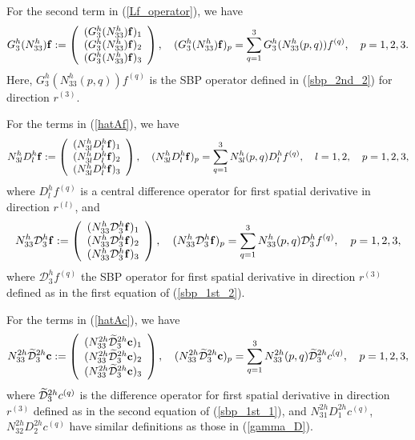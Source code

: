 For the second term in (\ref{Lf_operator}), we have
\begin{align}\label{3_10_2}
{{G}}_3^{h}({N}_{33}^{h}){\bf f} := \left(\begin{array}{c}
({{G}}_3^{h}({N}_{33}^{h}){\bf f})_1 \\
({{G}}_3^{h}({N}_{33}^{h}){\bf f})_2 \\
({{G}}_3^{h}({N}_{33}^{h}){\bf f})_3 
\end{array}\right), \quad ({{G}}_3^{h}({N}_{33}^{h}){\bf f})_p = \sum_{q = 1}^{3} {G}_3^{h}(N_{33}^{h}(p,q)) {f}^{(q)},\quad p = 1,2,3.
\end{align}
Here, ${G}_3^{h}(N_{33}^{h}(p,q)) {f}^{(q)}$ is the SBP operator defined in (\ref{sbp_2nd_2}) for direction $r^{(3)}$. 

For the terms in (\ref{hatAf}), we have
\begin{align}\label{gamma_D} 
{N}_{3l}^hD_l^h{\bf f} := \left(\begin{array}{c}
({N}_{3l}^hD_l^h{\bf f})_1 \\
({N}_{3l}^hD_l^h{\bf f})_2 \\
({N}_{3l}^hD_l^h{\bf f})_3 
\end{array}\right), \quad ({N}_{3l}^hD_l^h{\bf f})_p = \sum_{q = 1}^{3} N_{3l}^h(p,q)D_l^h{f}^{(q)},\quad l = 1,2, \quad p = 1,2,3,
\end{align}
where $D_l^h{f}^{(q)}$ is a central difference operator for first spatial derivative in direction $r^{(l)}$, and
\begin{align}\label{gamma_D1}
{N}_{33}^h\mathcal{D}_3^h{\bf f} := \left(\begin{array}{c}
({N}_{33}^h\mathcal{D}_3^h{\bf f})_1 \\
({N}_{33}^h\mathcal{D}_3^h{\bf f})_2 \\
({N}_{33}^h\mathcal{D}_3^h{\bf f})_3 
\end{array}\right), \quad ({N}_{33}^h\mathcal{D}_3^h{\bf f})_p = \sum_{q = 1}^{3} N_{33}^h(p,q)\mathcal{D}_3^h{f}^{(q)},\quad p = 1,2,3,
\end{align}
where $\mathcal{D}_3^h{f}^{(q)}$ the SBP operator for first spatial derivative in direction $r^{(3)}$ defined as in the first equation of (\ref{sbp_1st_2}).

For the terms in (\ref{hatAc}), we have
\begin{align}\label{3_17}
{N}_{33}^{2h}\wt{\mathcal{D}}_3^{2h}{\bf c} := \left(\begin{array}{c}
({N}_{33}^{2h}\wt{\mathcal{D}}_3^{2h}{\bf c})_1 \\
({N}_{33}^{2h}\wt{\mathcal{D}}_3^{2h}{\bf c})_2 \\
({N}_{33}^{2h}\wt{\mathcal{D}}_3^{2h}{\bf c})_3 
\end{array}\right), \quad ({N}_{33}^{2h}\wt{\mathcal{D}}_3^{2h}{\bf c})_p = \sum_{q = 1}^{3} N_{33}^{2h}(p,q)\wt{\mathcal{D}}_3^{2h}{c}^{(q)},\quad p = 1,2,3,
\end{align}
where $\widetilde{\mathcal{D}}_3^{2h}{c}^{(q)}$ is the difference operator for first spatial derivative in direction $r^{(3)}$ defined as in the second equation of (\ref{sbp_1st_1}), and $N_{31}^{2h}{D}_1^{2h}{c}^{(q)}$, $N_{32}^{2h}{D}_2^{2h}{c}^{(q)}$ have similar definitions as those in (\ref{gamma_D}). 